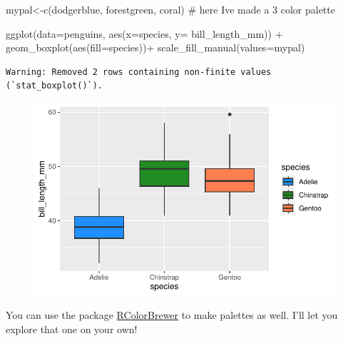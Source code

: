 \documentclass[
  letterpaper,
  DIV=11,
  numbers=noendperiod]{scrartcl}
\newenvironment{Shaded}{\begin{snugshade}}{\end{snugshade}}
\newcommand{\AttributeTok}[1]{\textcolor[rgb]{0.40,0.45,0.13}{#1}}
\newcommand{\CommentTok}[1]{\textcolor[rgb]{0.37,0.37,0.37}{#1}}
\newcommand{\FunctionTok}[1]{\textcolor[rgb]{0.28,0.35,0.67}{#1}}
\newcommand{\NormalTok}[1]{\textcolor[rgb]{0.00,0.23,0.31}{#1}}
\newcommand{\OtherTok}[1]{\textcolor[rgb]{0.00,0.23,0.31}{#1}}
\newcommand{\SpecialCharTok}[1]{\textcolor[rgb]{0.37,0.37,0.37}{#1}}
\newcommand{\StringTok}[1]{\textcolor[rgb]{0.13,0.47,0.30}{#1}}
\begin{document}
\begin{Shaded}
\begin{Highlighting}[]
\NormalTok{mypal}\OtherTok{\textless{}{-}}\FunctionTok{c}\NormalTok{(}\StringTok{\textquotesingle{}dodgerblue\textquotesingle{}}\NormalTok{, }\StringTok{\textquotesingle{}forestgreen\textquotesingle{}}\NormalTok{, }\StringTok{\textquotesingle{}coral\textquotesingle{}}\NormalTok{) }\CommentTok{\# here I\textquotesingle{}ve made a 3 color palette}

\FunctionTok{ggplot}\NormalTok{(}\AttributeTok{data=}\NormalTok{penguins, }\FunctionTok{aes}\NormalTok{(}\AttributeTok{x=}\NormalTok{species, }\AttributeTok{y=}\NormalTok{ bill\_length\_mm)) }\SpecialCharTok{+}
  \FunctionTok{geom\_boxplot}\NormalTok{(}\FunctionTok{aes}\NormalTok{(}\AttributeTok{fill=}\NormalTok{species))}\SpecialCharTok{+}
  \FunctionTok{scale\_fill\_manual}\NormalTok{(}\AttributeTok{values=}\NormalTok{mypal)}
\end{Highlighting}
\end{Shaded}

\begin{verbatim}
Warning: Removed 2 rows containing non-finite values (`stat_boxplot()`).
\end{verbatim}

\begin{figure}[H]

{\centering \includegraphics{colors_files/figure-pdf/unnamed-chunk-5-1.pdf}

}

\end{figure}

You can use the package
\href{https://renenyffenegger.ch/notes/development/languages/R/packages/RColorBrewer/index}{RColorBrewer}
to make palettes as well. I'll let you explore that one on your own!
\end{document}
